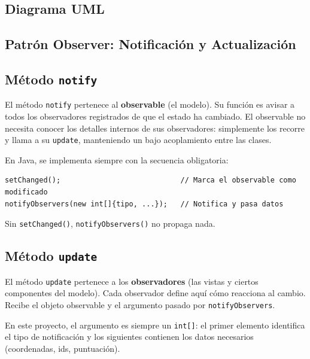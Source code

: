 \documentclass[12pt, a4paper]{article}
\begin{document}
\subsection{Diagrama UML}
 
 
\subsection{Patr\'{o}n Observer: Notificaci\'{o}n y Actualizaci\'{o}n}
 
\subsection{M\'{e}todo \texttt{notify}}
 
El m\'{e}todo \texttt{notify} pertenece al \textbf{observable} (el modelo). Su funci\'{o}n es avisar a todos los observadores registrados de que el estado ha cambiado. El observable no necesita conocer los detalles internos de sus observadores: simplemente los recorre y llama a su \texttt{update}, manteniendo un bajo acoplamiento entre las clases.
 
En Java, se implementa siempre con la secuencia obligatoria:
\begin{lstlisting}
setChanged();                            // Marca el observable como modificado
notifyObservers(new int[]{tipo, ...});   // Notifica y pasa datos
\end{lstlisting}
 
Sin \texttt{setChanged()}, \texttt{notifyObservers()} no propaga nada.
 
\subsection{M\'{e}todo \texttt{update}}
 
El m\'{e}todo \texttt{update} pertenece a los \textbf{observadores} (las vistas y ciertos componentes del modelo). Cada observador define aqu\'{i} c\'{o}mo reacciona al cambio. Recibe el objeto observable y el argumento pasado por \texttt{notifyObservers}.
 
En este proyecto, el argumento es siempre un \texttt{int[]}: el primer elemento identifica el tipo de notificaci\'{o}n y los siguientes contienen los datos necesarios (coordenadas, ids, puntuaci\'{o}n). 
 
\end{document}
